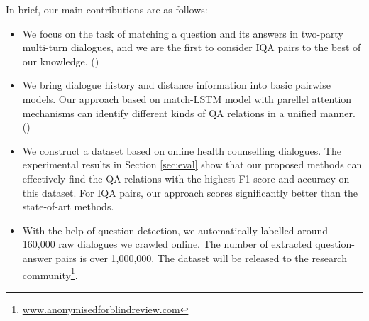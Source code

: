 In brief, our main contributions are as follows:
\begin{itemize}
    \item We focus on the task of matching a question and its answers in two-party multi-turn dialogues, and we are the first to consider IQA pairs to the best of our knowledge. ()
    \item We bring dialogue history and distance information into basic pairwise models. Our approach based on match-LSTM  model with parellel attention mechanisms can identify different kinds of QA relations in a unified manner. () %
    \item We construct a dataset based on online health counselling dialogues. The experimental results in Section \ref{sec:eval} show that our proposed methods can effectively find the QA relations with the highest F1-score and accuracy on this dataset. For IQA pairs, our approach scores significantly better than the state-of-art methods.
    \item With the help of question detection, we automatically labelled around 160,000 raw dialogues we crawled online. The number of extracted question-answer pairs is over 1,000,000. The dataset will be released to the research community\footnote{\url{www.anonymisedforblindreview.com}}.
\end{itemize}

